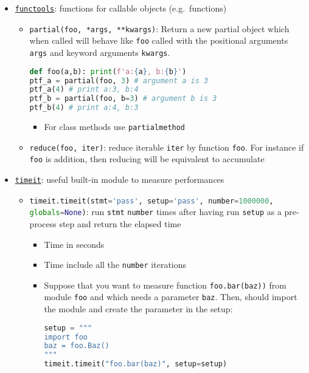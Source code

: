 \documentclass[a4paper,12pt,%
              final%
              ]{article}
\begin{document}
\begin{itemize}
\begin{itemize}
\begin{itemize}
        \end{itemize}
    \end{itemize}
  \item \href{https://docs.python.org/3/library/functools.html}{\texttt{functools}}: functions for callable objects (e.g.\ functions)
    \begin{itemize}
      \item \verb|partial(foo, *args, **kwargs)|: Return a new partial object which when called will behave like \texttt{foo} called with the positional arguments \texttt{args} and keyword arguments \texttt{kwargs}.
\begin{lstlisting}[language=python]
def foo(a,b): print(f'a:{a}, b:{b}')
ptf_a = partial(foo, 3) # argument a is 3
ptf_a(4) # print a:3, b:4
ptf_b = partial(foo, b=3) # argument b is 3
ptf_b(4) # print a:4, b:3
\end{lstlisting}
        \begin{itemize}
          \item For class methods use \texttt{partialmethod}
        \end{itemize}
      \item \verb|reduce(foo, iter)|: reduce iterable \texttt{iter} by function \texttt{foo}. For instance if \texttt{foo} is addition, then reducing will be equivalent to accumulate
    \end{itemize}
  \item \href{https://docs.python.org/3/library/timeit.html}{\texttt{timeit}}: useful built-in module to measure performances
    \begin{itemize}
      \item \lstinline[language=python]{timeit.timeit(stmt='pass', setup='pass', number=1000000, globals=None)}: run \texttt{stmt} \texttt{number} times after having run \texttt{setup} as a pre-process step and return the elapsed time
        \begin{itemize}
          \item Time in seconds
          \item Time include all the \texttt{number} iterations
          \item Suppose that you want to measure function \lstinline[language=python]{foo.bar(baz))} from module \texttt{foo} and which needs a parameter \texttt{baz}. Then, should import the module and create the parameter in the setup:
\begin{lstlisting}[language=python]
setup = """
import foo
baz = foo.Baz()
"""
timeit.timeit("foo.bar(baz)", setup=setup)

\end{lstlisting}
\end{itemize}
\end{itemize}
\end{itemize}
\end{document}
